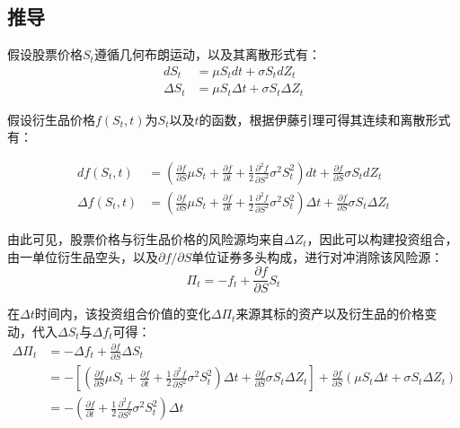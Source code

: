\documentclass[11pt]{article}
\begin{document}
\subsection{推导}

假设股票价格$S_t$遵循几何布朗运动，以及其离散形式有：
\begin{align*}
    d S_t & = \mu S_t dt + \sigma S_t d Z_t \\
    \Delta S_t & = \mu S_t \Delta t + \sigma S_t \Delta Z_t
\end{align*}

假设衍生品价格$f(S_t, t)$为$S_t$以及$t$的函数，根据伊藤引理可得其连续和离散形式有：

\begin{align*}
    df(S_t,t) & = \left(\frac{\partial f}{\partial S} \mu S_t  + \frac{\partial f}{\partial t} + \frac{1}{2}\frac{\partial^2 f}{\partial S^2} \sigma^2 S_t^2 \right)dt + \frac{\partial f}{\partial S} \sigma S_t dZ_t \\
    \Delta f(S_t,t) & = \left(\frac{\partial f}{\partial S} \mu S_t  + \frac{\partial f}{\partial t} + \frac{1}{2}\frac{\partial^2 f}{\partial S^2} \sigma^2 S_t^2 \right) \Delta t + \frac{\partial f}{\partial S} \sigma S_t \Delta Z_t
\end{align*}

由此可见，股票价格与衍生品价格的风险源均来自$\Delta Z_t$，因此可以构建投资组合，由一单位衍生品空头，以及$\partial f/\partial S$单位证券多头构成，进行对冲消除该风险源：
\begin{equation*}
    \Pi_t = -f_t + \frac{\partial f}{\partial S} S_t
\end{equation*}

在$\Delta t$时间内，该投资组合价值的变化$\Delta \Pi_t$来源其标的资产以及衍生品的价格变动，代入$\Delta S_t$与$\Delta f_t$可得：
\begin{align*}
    \Delta \Pi_t & = -\Delta f_t + \frac{\partial f}{\partial S} \Delta S_t \\
    & = -\left[ \left(\frac{\partial f}{\partial S} \mu S_t  + \frac{\partial f}{\partial t} + \frac{1}{2}\frac{\partial^2 f}{\partial S^2} \sigma^2 S_t^2 \right) \Delta t + \frac{\partial f}{\partial S} \sigma S_t \Delta Z_t \right] + \frac{\partial f}{\partial S} \left( \mu S_t \Delta t + \sigma S_t \Delta Z_t \right) \\
    & = -\left( \frac{\partial f}{\partial t} + \frac{1}{2}\frac{\partial^2 f}{\partial S^2} \sigma^2 S_t^2 \right) \Delta t \\
\end{align*}
\end{document}
